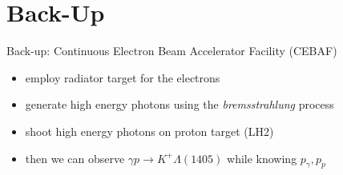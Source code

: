 \documentclass[11pt,aspectratio=1610,dvipsnames]{beamer}
\begin{document}
\section*{Back-Up}
\begin{frame}{Back-up: Continuous Electron Beam Accelerator Facility (CEBAF)}
	\begin{tcolorbox}[colback=black!10,colframe=gray!20!black,title=How can we access $\Lambda(1405)$ with this setup?]
		\begin{itemize}
			\item employ radiator target for the electrons
			\item generate high energy photons using the \emph{bremsstrahlung} process
			\item shoot high energy photons on proton target (LH2)
			\item then we can observe $\gamma p \to K^+\Lambda(1405)$ while knowing $p_\gamma,p_p$
		\end{itemize} 
		
	\end{tcolorbox}
\end{frame}
\end{document}
